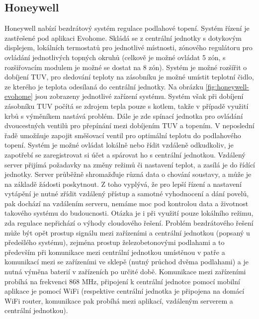 \subsection{Honeywell}
Honeywell nabízí bezdrátový systém regulace podlahové topení. Systém řízení je zastřešené pod aplikaci Evohome. Skládá se z centrální jednotky s dotykovým displejem, lokálních termostatů pro jednotlivé místnosti, zónového regulátoru pro ovládání jednotlivých topných okruhů (celkově je možné ovládat 5 zón, s rozšiřovacím modulem je možné se dostat na 8 zón). Systém je možné rozšířit o dobíjení TUV, pro sledování teploty na zásobníku je možné umístit teplotní čidlo, ze kterého je teplota odesílaná do centrální jednotky. Na obrázku \ref{fig:honeywell-evohome} jsou zobrazeny jednotlivé zařízení systému. Systém však při dobíjení zásobníku TUV počítá se zdrojem tepla pouze s kotlem, takže v případě využití krbů s výměníkem nastává problém. Dále je zde spínací jednotka pro ovládání dvoucestných ventilů pro přepínání mezi dobíjením TUV a topením. V neposlední řadě umožňuje zapojit směšovací ventil pro optimální teplotu do podlahového topení. Systém je možné ovládat lokálně nebo řídit vzdáleně odkudkoliv, je zapotřebí se zaregistrovat si účet a spárovat ho s  centrální jednotkou. Vzdálený server přijímá požadavky na změny režimů či nastavení teplot, a zasílá je do řídící jednotky. Server průběžně shromažďuje různá data o chování soustavy, a může je na základě žádosti poskytnout. Z toho vyplývá, že pro lepší řízení a nastavení vytápění je nutné zřídit vzdálený přístup a samotné vyhodnocení a dání povelů, pak dochází na vzdálením serveru, nemáme moc pod kontrolou data a životnost takového systému do budoucnosti. Otázka je i při využití pouze lokálního režimu, zda regulace nepřichází o výhody cloudového řešení. Problém bezdrátového řešení může být opět prostup signálu mezi zařízeními a centrální jednotkou (popsaný u předešlého systému), zejména prostup železobetonovými podlahami a to především při komunikace mezi centrální jednotkou umístěnou v patře a komunikací mezi se zařízeními ve sklepě (nutný průchod dvěma podlahami) a je nutná výměna baterií v zařízeních po určité době. Komunikace mezi zařízeními probíhá na frekvenci 868 MHz, připojení k centrální jednotce pomocí mobilní aplikace je pomocí WiFi (respektive centrální jednotka je připojena na domácí WiFi router, komunikace pak probíhá mezi aplikací, vzdáleným serverem a centrální jednotkou).

